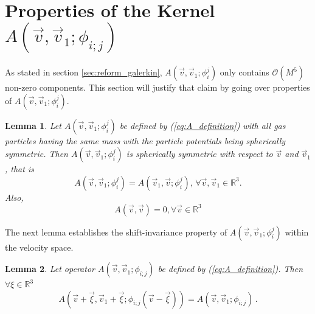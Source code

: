 \documentclass[12pt]{CSUNthesis}
\def\R{\mathbb{R}}
\newtheorem{lemma}{Lemma}
\def\R{\mathbb{R}}
\newcommand{\vecv}{\vec{v}}
\begin{document}
\section{Properties of the Kernel $A(\vecv,\vecv_1;\phi_{i;j})$}
\label{sec:props_of_a} 



As stated in section \ref{sec:reform_galerkin}, $A(\vecv,\vecv_1;\phi_{i}^j)$ only contains $\mathcal{O}(M^5)$ non-zero components. This section will justify that claim by going over properties of $A(\vecv,\vecv_1;\phi_{i}^j)$. 

\begin{lemma}
\label{lem0}
Let  $A(\vecv,\vecv_1;\phi_{i}^j)$ be defined by (\ref{eq:A_definition}) with all gas particles having the same mass with the particle potentials being spherically symmetric. Then  $A(\vecv,\vecv_1;\phi_{i}^j)$ is spherically symmetric with respect to $\vecv$ and $\vecv_1$, that is
\begin{equation}
A(\vecv,\vecv_1;\phi_{i}^j) = A(\vecv_1,\vecv;\phi_{i}^j), \, \forall \vecv, \vecv_1 \in \R^3. 
\end{equation}
Also,
\begin{equation}
A(\vecv,\vecv)=0, \forall \vecv \in \R^3
\end{equation}

\end{lemma}

The next lemma establishes the shift-invariance property of $A(\vecv,\vecv_1;\phi_{i}^j)$ within the velocity space.
\begin{lemma}
\label{lem1} 
Let operator $A(\vec{v},\vec{v}_{1};\phi_{i;j})$ be defined by (\ref{eq:A_definition}). Then $\forall\xi\in \R^3$
\begin{equation*}
A(\vec{v}+\vec{\xi},\vec{v}_{1}+\vec{\xi};\phi_{i;j}(\vec{v}-\vec{\xi}))=
A(\vec{v},\vec{v}_{1};\phi_{i;j}) \, .
\end{equation*}
\end{lemma}
\end{document}

